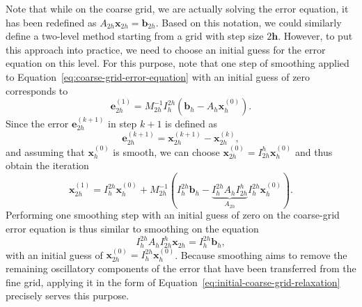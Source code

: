 Note that while on the coarse grid, we are actually solving the error equation, it has been redefined as $A_{2h} \bm{x}_{2h} = \bm{b}_{2h}$.
Based on this notation, we could similarly define a two-level method starting from a grid with step size $2\bm{h}$.
However, to put this approach into practice, we need to choose an initial guess for the error equation on this level.
For this purpose, note that one step of smoothing applied to Equation~\eqref{eq:coarse-grid-error-equation} with an initial guess of zero corresponds to
\begin{equation}
	\bm{e}_{2h}^{(1)} = M_{2h}^{-1} I_{h}^{2h} \left(\bm{b}_h - A_h \bm{x}^{(0)}_h\right).
	\label{eq:initial-coarse-grid-relaxation}
\end{equation}
Since the error $\bm{e}_{2h}^{(k+1)}$ in step $k+1$ is defined as
\begin{equation*}
	\bm{e}_{2h}^{(k+1)} = \bm{x}_{2h}^{(k+1)} - \bm{x}_{2h}^{(k)},
\end{equation*}
and assuming that $\bm{x}_{h}^{(0)}$ is smooth, we can choose $\bm{x}_{2h}^{(0)} = I_{2h}^{h} \bm{x}_{h}^{(0)}$ and thus obtain the iteration
\begin{equation}
	\bm{x}_{2h}^{(1)} = I_{h}^{2h} \bm{x}_{h}^{(0)} + M_{2h}^{-1} ( I_{h}^{2h} \bm{b}_h - \underbrace{I_{h}^{2h} A_h I_{2h}^{h}}_{A_{2h}} I_{h}^{2h} \bm{x}_{h}^{(0)} ).
\end{equation}
Performing one smoothing step with an initial guess of zero on the coarse-grid error equation is thus similar to smoothing on the equation
\begin{equation}
	I_{h}^{2h} A_h I_{2h}^h \bm{x}_{2h} = I_{h}^{2h} \bm{b}_h,
\end{equation}
with an initial guess of $\bm{x}_{2h}^{(0)} = I_{h}^{2h} \bm{x}_{h}^{(0)}$.
Because smoothing aims to remove the remaining oscillatory components of the error that have been transferred from the fine grid, applying it in the form of Equation~\eqref{eq:initial-coarse-grid-relaxation} precisely serves this purpose.

